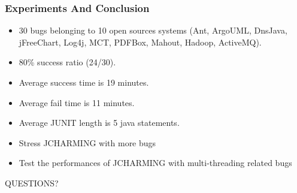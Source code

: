 \documentclass{beamer}
\begin{document}
\begin{frame}
\frametitle{Experiments And Conclusion}

\begin{itemize}
  \item 30 bugs belonging to 10 open sources systems (Ant, ArgoUML, DnsJava, jFreeChart, Log4j, MCT, PDFBox, Mahout, Hadoop, ActiveMQ).
  \item 80\% success ratio (24/30).
  \item Average success time is 19 minutes.
  \item Average fail time is 11 minutes.
  \item Average JUNIT length is 5 java statements.

  \vspace{0.5cm}
  \item Stress JCHARMING with more bugs
  \item Test the performances of JCHARMING with multi-threading related bugs
\end{itemize}

\end{frame}


\begin{frame}
\Huge{\centerline{QUESTIONS?}}
\end{frame}

\end{document}
